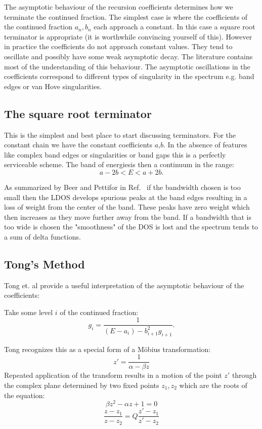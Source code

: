 The asymptotic behaviour of  the recursion coefficients determines
how we terminate the continued fraction. The simplest case is where
the coefficients of the continued fraction $a_n,b_n$ each approach a constant.
In this case a square root terminator is appropriate (it is worthwhile convincing 
yourself of this). However in practice the coefficients do not approach constant 
values. They tend to oscillate and possibly have some weak asymptotic decay.
The literature contains most of the understanding of this behaviour. The 
asymptotic oscillations in the coefficients correspond to different types
of singularity in the spectrum e.g. band edges or van Hove singularities.

\subsection{The square root terminator}
This is the simplest and best place to start discussing 
terminators. For the constant chain we have the constant
coefficients $a$,$b$. In the absence of features like complex
band edges or singularities or band gaps this is a perfectly
serviceable scheme. The band of energiesis then a continuum in the range:
\begin{equation}
a-2b < E < a+2b.
\end{equation}

As summarized by Beer and Pettifor in Ref.~\cite{nato1984} if the 
bandwidth chosen is too small then the LDOS develops spurious peaks
at the band edges resulting in a loss of weight from the center of 
the band. These peaks have zero weight which then increases as they
move further away from the band. If a bandwidth that is too wide is 
chosen the "smoothness" of the DOS is lost and the spectrum tends
to a sum of delta functions.

\subsection{Tong's Method}
Tong et. al \cite{tong80} provide a useful interpretation of the asymptotic 
behaviour of the coefficients:

Take some level $i$ of the continued fraction:
\begin{equation}
g_{i} = \frac{1}{(E-a_{i})-b^{2}_{i+1}g_{i+1}}.
\end{equation}

Tong recognizes this as a special form of a M\"obius transformation:
%
\begin{equation}
z' = \frac{1}{\alpha - \beta z}
\end{equation}
%
Repeated application of the transform results in a motion of the point $z'$ through
the complex plane determined by two fixed points $z_{1},z_{2}$ which are the roots
of the equation:
%
\begin{equation}
\beta z^{2} - \alpha z + 1 = 0
\end{equation}
%
\begin{equation}
\frac{z-z_1}{z-z_2} = Q \frac{z'-z_1}{z'-z_2}
\end{equation}

